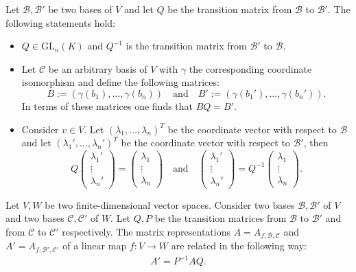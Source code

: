     \begin{property}\label{linalgebra:theorem:transition_matrix}
        Let $\mathcal{B},\mathcal{B}'$ be two bases of $V$ and let $Q$ be the transition matrix from $\mathcal{B}$ to $\mathcal{B}'$. The following statements hold:
        \begin{itemize}
            \item $Q\in\text{GL}_n(K)$ and $Q^{-1}$ is the transition matrix from $\mathcal{B}'$ to $\mathcal{B}$.
            \item Let $\mathcal{C}$ be an arbitrary basis of $V$ with $\gamma$ the corresponding coordinate isomorphism and define the following matrices: \[B:=(\gamma(b_1),\ldots,\gamma(b_n))\quad\text{and}\quad B':=(\gamma(b_1'),\ldots,\gamma(b_n')).\] In terms of these matrices one finds that $BQ = B'$.
            \item Consider $v\in V$. Let $(\lambda_1,\ldots,\lambda_n)^T$ be the coordinate vector with respect to $\mathcal{B}$ and let $(\lambda_1',\ldots,\lambda_n')^T$ be the coordinate vector with respect to $\mathcal{B}'$, then
                \[
                    Q
                    \begin{pmatrix}
                        \lambda_1'\\\vdots\\\lambda_n'
                    \end{pmatrix}
                    =
                    \begin{pmatrix}
                        \lambda_1\\\vdots\\\lambda_n
                    \end{pmatrix}
                    \quad\text{and}\quad
                    \begin{pmatrix}
                        \lambda_1'\\\vdots\\\lambda_n'
                    \end{pmatrix}
                    = Q^{-1}
                    \begin{pmatrix}
                        \lambda_1\\\vdots\\\lambda_n
                    \end{pmatrix}.
                \]
        \end{itemize}
    \end{property}
    \begin{result}\label{linalgebra:theorem:transition_matrix_representation}
        Let $V,W$ be two finite-dimensional vector spaces. Consider two bases $\mathcal{B},\mathcal{B}'$ of $V$ and two bases $\mathcal{C},\mathcal{C}'$ of $W$. Let $Q,P$ be the transition matrices from $\mathcal{B}$ to $\mathcal{B}'$ and from $\mathcal{C}$ to $\mathcal{C}'$ respectively. The matrix representations $A=A_{f,\mathcal{B},\mathcal{C}}$ and $A' = A_{f,\mathcal{B}',\mathcal{C}'}$ of a linear map $f:V\rightarrow W$ are related in the following way:
        \begin{gather}
            A' = P^{-1}AQ.
        \end{gather}
    \end{result}

